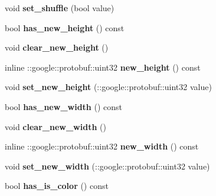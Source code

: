 \begin{DoxyCompactItemize}
void {\bfseries set\+\_\+shuffle} (bool value)
\item 
\mbox{\label{classcaffe_1_1_image_data_parameter_a4bc22dd8baa02b9ba7a9f2aa4e5327b9}} 
bool {\bfseries has\+\_\+new\+\_\+height} () const
\item 
\mbox{\label{classcaffe_1_1_image_data_parameter_aa476df32cb4bf04a7bafc428c46f9e43}} 
void {\bfseries clear\+\_\+new\+\_\+height} ()
\item 
\mbox{\label{classcaffe_1_1_image_data_parameter_a963d8f1ab0cffa76f2bf4b8aea622093}} 
inline \+::google\+::protobuf\+::uint32 {\bfseries new\+\_\+height} () const
\item 
\mbox{\label{classcaffe_1_1_image_data_parameter_a3e5996c15927ccc14f3601241ebdd18d}} 
void {\bfseries set\+\_\+new\+\_\+height} (\+::google\+::protobuf\+::uint32 value)
\item 
\mbox{\label{classcaffe_1_1_image_data_parameter_ad5d6ef8ff6787e055c9bd6280e8e91cc}} 
bool {\bfseries has\+\_\+new\+\_\+width} () const
\item 
\mbox{\label{classcaffe_1_1_image_data_parameter_ae9829aaddb47321696ef6ea84c3fa66c}} 
void {\bfseries clear\+\_\+new\+\_\+width} ()
\item 
\mbox{\label{classcaffe_1_1_image_data_parameter_a79ef4d15ec68442ca545d09e9091687d}} 
inline \+::google\+::protobuf\+::uint32 {\bfseries new\+\_\+width} () const
\item 
\mbox{\label{classcaffe_1_1_image_data_parameter_aafed93a43742053f145c67332a22ff01}} 
void {\bfseries set\+\_\+new\+\_\+width} (\+::google\+::protobuf\+::uint32 value)
\item 
\mbox{\label{classcaffe_1_1_image_data_parameter_a6fbd82897f98599d0b7b0469c76dee89}} 
bool {\bfseries has\+\_\+is\+\_\+color} () const
\item 
\mbox{\label{classcaffe_1_1_image_data_parameter_adbee8b086028c3c3de607881d433fad3}} 

\end{DoxyCompactItemize}

